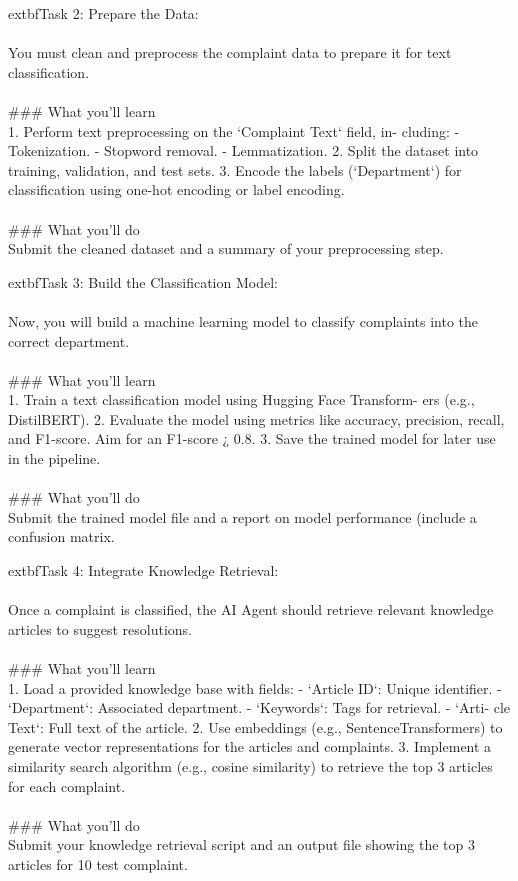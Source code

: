 \documentclass{article}
\begin{document}
	extbf{Task 2:} Prepare the Data:  \\
 \\
 You must clean and preprocess the complaint data to prepare it for text classification. \\
 \\
### What you'll learn \\
1. Perform text preprocessing on the ‘Complaint Text‘ field, in- cluding: - Tokenization. - Stopword removal. - Lemmatization. 2. Split the dataset into training, validation, and test sets. 3. Encode the labels (‘Department‘) for classification using one-hot encoding or label encoding. \\
 \\
### What you'll do \\
Submit the cleaned dataset and a summary of your preprocessing step.

	extbf{Task 3:} Build the Classification Model:  \\
 \\
 Now, you will build a machine learning model to classify complaints into the correct department. \\
 \\
### What you'll learn \\
1. Train a text classification model using Hugging Face Transform- ers (e.g., DistilBERT). 2. Evaluate the model using metrics like accuracy, precision, recall, and F1-score. Aim for an F1-score ¿ 0.8. 3. Save the trained model for later use in the pipeline. \\
 \\
### What you'll do \\
Submit the trained model file and a report on model performance (include a confusion matrix.

	extbf{Task 4:} Integrate Knowledge Retrieval:  \\
 \\
 Once a complaint is classified, the AI Agent should retrieve relevant knowledge articles to suggest resolutions. \\
 \\
### What you'll learn \\
1. Load a provided knowledge base with fields: - ‘Article ID‘: Unique identifier. - ‘Department‘: Associated department. - ‘Keywords‘: Tags for retrieval. - ‘Arti- cle Text‘: Full text of the article. 2. Use embeddings (e.g., SentenceTransformers) to generate vector representations for the articles and complaints. 3. Implement a similarity search algorithm (e.g., cosine similarity) to retrieve the top 3 articles for each complaint. \\
 \\
### What you'll do \\
Submit your knowledge retrieval script and an output file showing the top 3 articles for 10 test complaint.
\end{document}
